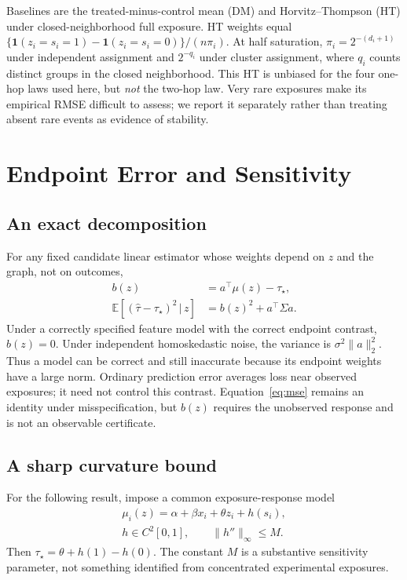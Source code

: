 \documentclass{article}
\newcommand{\E}{\mathbb E}
\newcommand{\one}{\mathbf 1}
\newcommand{\gate}{\tau_\star}
\newcommand{\given}{\,\vert\,}
\begin{document}
Baselines are the treated-minus-control mean (DM) and Horvitz--Thompson (HT) under closed-neighborhood full exposure. HT weights equal $\{\one(z_i=s_i=1)-\one(z_i=s_i=0)\}/(n\pi_i)$. At half saturation, $\pi_i=2^{-(d_i+1)}$ under independent assignment and $2^{-q_i}$ under cluster assignment, where $q_i$ counts distinct groups in the closed neighborhood. This HT is unbiased for the four one-hop laws used here, but \emph{not} the two-hop law. Very rare exposures make its empirical RMSE difficult to assess; we report it separately rather than treating absent rare events as evidence of stability.

\section{Endpoint Error and Sensitivity}
\subsection{An exact decomposition}
For any fixed candidate linear estimator whose weights depend on $z$ and the graph, not on outcomes,
\begin{align}
b(z)&=a^\top\mu(z)-\gate,\nonumber\\
\E[(\widehat\tau-\gate)^2\given z]
 &=b(z)^2+a^\top\Sigma a.
\label{eq:mse}
\end{align}
Under a correctly specified feature model with the correct endpoint contrast, $b(z)=0$. Under independent homoskedastic noise, the variance is $\sigma^2\|a\|_2^2$. Thus a model can be correct and still inaccurate because its endpoint weights have a large norm. Ordinary prediction error averages loss near observed exposures; it need not control this contrast. Equation~\eqref{eq:mse} remains an identity under misspecification, but $b(z)$ requires the unobserved response and is not an observable certificate.

\subsection{A sharp curvature bound}
For the following result, impose a common exposure-response model
\begin{equation}
\begin{gathered}
\mu_i(z)=\alpha+\beta x_i+\theta z_i+h(s_i),\\
h\in C^2[0,1],\qquad \|h''\|_\infty\le M.
\end{gathered}
\label{eq:smooth}
\end{equation}
Then $\gate=\theta+h(1)-h(0)$. The constant $M$ is a substantive sensitivity parameter, not something identified from concentrated experimental exposures.
\end{document}
